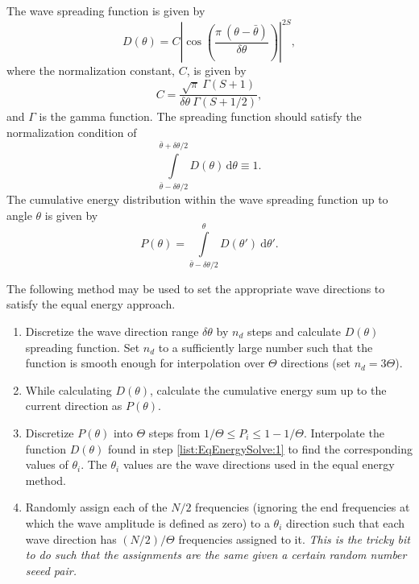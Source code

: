 The wave spreading function is given by
\begin{equation}
   D(\theta)   = C \left| \cos\left(\frac{\pi \: (\theta - \bar\theta)}{\delta \theta}\right) \right|^{2S},
\label{eq:WaveSpread}
\end{equation}
where the normalization constant, $C$, is given by
\begin{equation}
   C = \frac{\sqrt{\pi} \: \Gamma(S+1)}{\delta\theta \: \Gamma(S+1/2)},
\label{eq:WaveSpread:Const}
\end{equation}
and $\Gamma$ is the gamma function.
The spreading function should satisfy the normalization condition of
\begin{equation}
   \int\limits^{\bar\theta+\delta\theta/2}_{\bar\theta-\delta\theta/2} D(\theta) \, \mathrm{d}\theta \equiv 1.
\label{eq:WaveSpread:Norm}
\end{equation}
The cumulative energy distribution within the wave spreading function up to angle $\theta$ is given by
\begin{equation}
   P(\theta) = \int\limits^{\theta}_{\bar\theta - \delta\theta/2} D(\theta') \: \mathrm{d}\theta'.
\label{eq:WaveSpread:Energy}
\end{equation}

The following method may be used to set the appropriate wave directions to satisfy the equal energy approach.
\begin{enumerate}
   \item{Discretize the wave direction range $\delta\theta$ by $n_d$ steps and calculate $D(\theta)$ spreading function.  Set $n_d$ to a sufficiently large number such that the function is smooth enough for interpolation over $\Theta$ directions (set $n_d = 3 \Theta$).\label{list:EqEnergySolve:1}}
   \item{While calculating $D(\theta)$, calculate the cumulative energy sum up to the current direction as $P(\theta)$.}
   \item{Discretize $P(\theta)$ into $\Theta$ steps from $1/\Theta \leq P_i \leq 1-1/\Theta$.  Interpolate the function $D(\theta)$ found in step \ref{list:EqEnergySolve:1} to find the corresponding values of $\theta_i$.  The $\theta_i$ values are the wave directions used in the equal energy method.}
   \item{Randomly assign each of the $N/2$ frequencies (ignoring the end frequencies at which the wave amplitude is defined as zero) to a $\theta_i$ direction such that each wave direction has $(N/2)/\Theta$ frequencies assigned to it. \emph{This is the tricky bit to do such that the assignments are the same given a certain random number seeed pair.}}   %
\end{enumerate}


